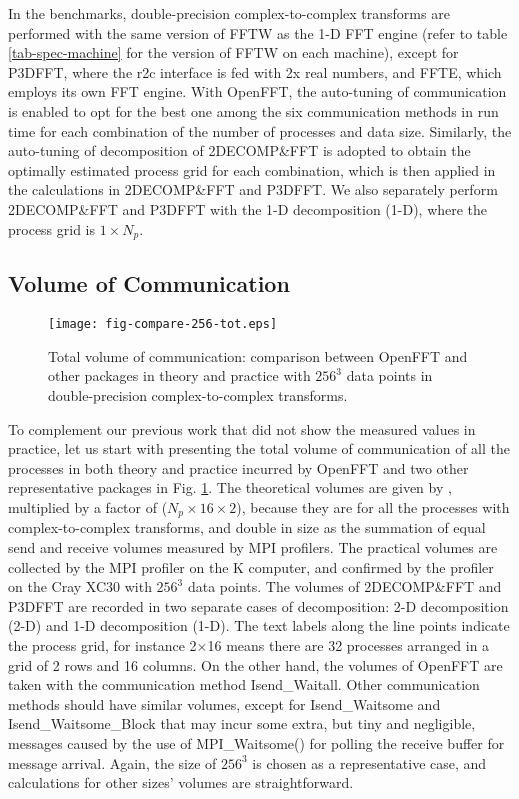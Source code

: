 In the benchmarks, double-precision complex-to-complex transforms are performed with the same version of FFTW \cite{FFTW} as the 1-D FFT engine (refer to table \ref{tab-spec-machine} for the version of FFTW on each machine), except for P3DFFT, where the r2c interface is fed with 2x real numbers, and FFTE, which employs its own FFT engine. With OpenFFT, the auto-tuning of communication is enabled to opt for the best one among the six communication methods in run time for each combination of the number of processes and data size. Similarly, the auto-tuning of decomposition of 2DECOMP\&FFT is adopted to obtain the optimally estimated process grid for each combination, which is then applied in the calculations in 2DECOMP\&FFT and P3DFFT. We also separately perform 2DECOMP\&FFT and P3DFFT with the 1-D decomposition (1-D), where the process grid is $1 \times N_p$. 

\subsection{Volume of Communication}

\begin{figure}[b]
\begin{center}
\texttt{[image: fig-compare-256-tot.eps]}
\end{center}
\caption{Total volume of communication: comparison between OpenFFT and other packages in theory and practice with $256^3$ data points in double-precision complex-to-complex transforms.}
\label{fig-compare-volume}
\end{figure}

To complement our previous work \cite{Duy2014153} that did not show the measured values in practice, let us start with presenting the total volume of communication of all the processes in both theory and practice incurred by OpenFFT and two other representative packages in Fig. \ref{fig-compare-volume}. The theoretical volumes are given by \cite{Duy2014153}, multiplied by a factor of ($N_p \times 16 \times 2$), because they are for all the processes with complex-to-complex transforms, and double in size as the summation of equal send and receive volumes measured by MPI profilers. The practical volumes are collected by the MPI profiler on the K computer, and confirmed by the profiler on the Cray XC30 with $256^3$ data points. The volumes of 2DECOMP\&FFT and P3DFFT are recorded in two separate cases of decomposition: 2-D decomposition (2-D) and 1-D decomposition (1-D). The text labels along the line points indicate the process grid, for instance 2$\times$16 means there are 32 processes arranged in a grid of 2 rows and 16 columns. On the other hand, the volumes of OpenFFT are taken with the communication method Isend\_Waitall. Other communication methods should have similar volumes, except for Isend\_Waitsome and Isend\_Waitsome\_Block that may incur some extra, but tiny and negligible, messages caused by the use of MPI\_Waitsome() for polling the receive buffer for message arrival. Again, the size of $256^3$ is chosen as a representative case, and calculations for other sizes' volumes are straightforward. 

